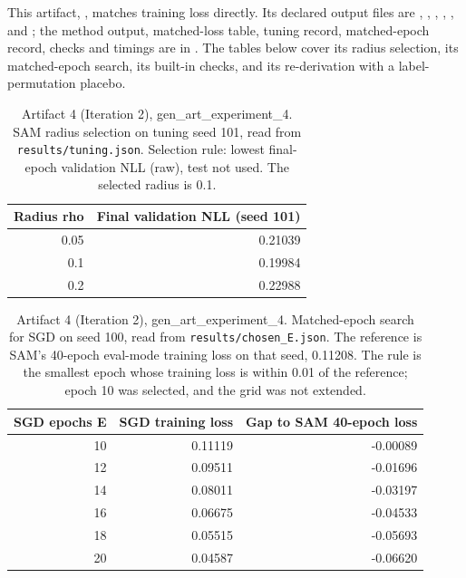 \documentclass[11pt,letterpaper]{article}
\begin{document}
This artifact, , matches training loss directly. Its declared output files are , , , , ,  and ; the method output, matched-loss table, tuning record, matched-epoch record, checks and timings are in . The tables below cover its radius selection, its matched-epoch search, its built-in checks, and its re-derivation with a label-permutation placebo.

\begin{table}[!htbp]
\centering
\footnotesize
\caption{Artifact 4 (Iteration 2), gen\_art\_experiment\_4. SAM radius selection on tuning seed 101, read from \texttt{results/tuning.json}. Selection rule: lowest final-epoch validation NLL (raw), test not used. The selected radius is 0.1.}
\label{tab:rho4}
\begin{tabular}{rr}
\toprule
Radius rho & Final validation NLL (seed 101) \\
\midrule
0.05 & 0.21039 \\
0.1 & 0.19984 \\
0.2 & 0.22988 \\
\bottomrule
\end{tabular}
\end{table}
\begin{table}[!htbp]
\centering
\scriptsize
\caption{Artifact 4 (Iteration 2), gen\_art\_experiment\_4. Matched-epoch search for SGD on seed 100, read from \texttt{results/chosen\_E.json}. The reference is SAM's 40-epoch eval-mode training loss on that seed, 0.11208. The rule is the smallest epoch whose training loss is within 0.01 of the reference; epoch 10 was selected, and the grid was not extended.}
\label{tab:matchE4}
\begin{tabular}{rrr}
\toprule
SGD epochs E & SGD training loss & Gap to SAM 40-epoch loss \\
\midrule
10 & 0.11119 & -0.00089 \\
12 & 0.09511 & -0.01696 \\
14 & 0.08011 & -0.03197 \\
16 & 0.06675 & -0.04533 \\
18 & 0.05515 & -0.05693 \\
20 & 0.04587 & -0.06620 \\
\bottomrule
\end{tabular}
\end{table}
\end{document}
